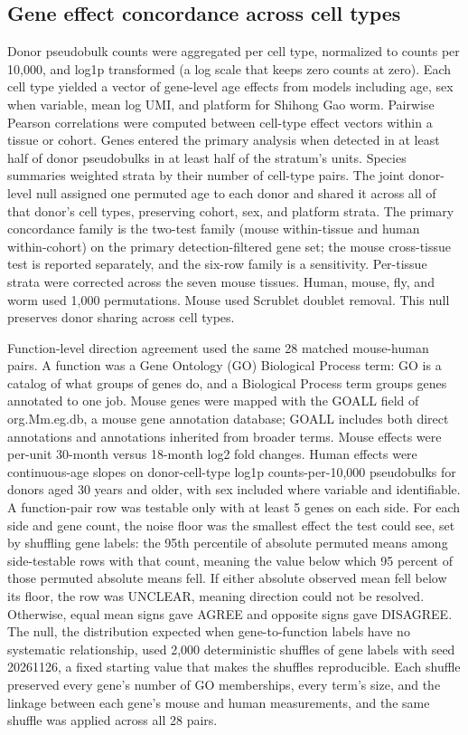 \documentclass[11pt]{article}
\begin{document}
\subsection*{Gene effect concordance across cell types}

Donor pseudobulk counts were aggregated per cell type, normalized to counts per 10,000, and log1p transformed (a log scale that keeps zero counts at zero). Each cell type yielded a vector of gene-level age effects from models including age, sex when variable, mean log UMI, and platform for Shihong Gao worm. Pairwise Pearson correlations were computed between cell-type effect vectors within a tissue or cohort. Genes entered the primary analysis when detected in at least half of donor pseudobulks in at least half of the stratum's units. Species summaries weighted strata by their number of cell-type pairs. The joint donor-level null assigned one permuted age to each donor and shared it across all of that donor's cell types, preserving cohort, sex, and platform strata. The primary concordance family is the two-test family (mouse within-tissue and human within-cohort) on the primary detection-filtered gene set; the mouse cross-tissue test is reported separately, and the six-row family is a sensitivity. Per-tissue strata were corrected across the seven mouse tissues. Human, mouse, fly, and worm used 1,000 permutations. Mouse used Scrublet doublet removal. This null preserves donor sharing across cell types.

Function-level direction agreement used the same 28 matched mouse-human pairs. A function was a Gene Ontology (GO) Biological Process term: GO is a catalog of what groups of genes do, and a Biological Process term groups genes annotated to one job. Mouse genes were mapped with the GOALL field of org.Mm.eg.db, a mouse gene annotation database; GOALL includes both direct annotations and annotations inherited from broader terms. Mouse effects were per-unit 30-month versus 18-month log2 fold changes. Human effects were continuous-age slopes on donor-cell-type log1p counts-per-10,000 pseudobulks for donors aged 30 years and older, with sex included where variable and identifiable. A function-pair row was testable only with at least 5 genes on each side. For each side and gene count, the noise floor was the smallest effect the test could see, set by shuffling gene labels: the 95th percentile of absolute permuted means among side-testable rows with that count, meaning the value below which 95 percent of those permuted absolute means fell. If either absolute observed mean fell below its floor, the row was UNCLEAR, meaning direction could not be resolved. Otherwise, equal mean signs gave AGREE and opposite signs gave DISAGREE. The null, the distribution expected when gene-to-function labels have no systematic relationship, used 2,000 deterministic shuffles of gene labels with seed 20261126, a fixed starting value that makes the shuffles reproducible. Each shuffle preserved every gene's number of GO memberships, every term's size, and the linkage between each gene's mouse and human measurements, and the same shuffle was applied across all 28 pairs.
\end{document}
